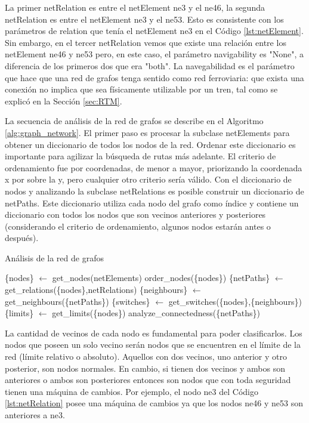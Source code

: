     La primer netRelation es entre el netElement ne3 y el ne46, la segunda netRelation es entre el netElement ne3 y el ne53. Esto es consistente con los parámetros de relation que tenía el netElement ne3 en el Código \ref{lst:netElement}. Sin embargo, en el tercer netRelation vemos que existe una relación entre los netElement ne46 y ne53 pero, en este caso, el parámetro navigability es "None", a diferencia de los primeros dos que era "both". La navegabilidad es el parámetro que hace que una red de grafos tenga sentido como red ferroviaria: que exista una conexión no implica que sea físicamente utilizable por un tren, tal como se explicó en la Sección \ref{sec:RTM}.
    
    La secuencia de análisis de la red de grafos se describe en el Algoritmo \ref{alg:graph_network}. El primer paso es procesar la subclase netElements para obtener un diccionario de todos los nodos de la red. Ordenar este diccionario es importante para agilizar la búsqueda de rutas más adelante. El criterio de ordenamiento fue por coordenadas, de menor a mayor, priorizando la coordenada x por sobre la y, pero cualquier otro criterio sería válido. Con el diccionario de nodos y analizando la subclase netRelations es posible construir un diccionario de netPaths. Este diccionario utiliza cada nodo del grafo como índice y contiene un diccionario con todos los nodos que son vecinos anteriores y posteriores (considerando el criterio de ordenamiento, algunos nodos estarán antes o después).
    
        \begin{algorithm}
            \caption{Análisis de la red de grafos}
            \label{alg:graph_network}
            \begin{algorithmic}
                \STATE \{nodes\} $\gets$ get\_nodes(netElements)
                \STATE  order\_nodes(\{nodes\})
                \STATE \{netPaths\} $\gets$ get\_relations(\{nodes\},netRelations)
                \STATE \{neighbours\} $\gets$ get\_neighbours(\{netPaths\})
                \STATE \{switches\} $\gets$ get\_switches(\{nodes\},\{neighbours\})
                \STATE \{limits\} $\gets$ get\_limits(\{nodes\})
                \STATE analyze\_connectedness(\{netPaths\})
            \end{algorithmic}
        \end{algorithm}

    La cantidad de vecinos de cada nodo es fundamental para poder clasificarlos. Los nodos que poseen un solo vecino serán nodos que se encuentren en el límite de la red (límite relativo o absoluto). Aquellos con dos vecinos, uno anterior y otro posterior, son nodos normales. En cambio, si tienen dos vecinos y ambos son anteriores o ambos son posteriores entonces son nodos que con toda seguridad tienen una máquina de cambios. Por ejemplo, el nodo ne3 del Código \ref{lst:netRelation} posee una máquina de cambios ya que los nodos ne46 y ne53 son anteriores a ne3.

